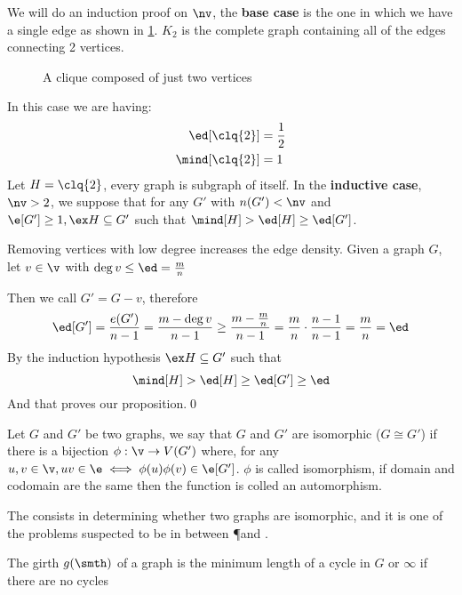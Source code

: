 \begin{prf}
    We will do an induction proof on $\nv$, the \textbf{base case} is the one in which we have a single edge as shown in \ref*{fig:k_2}. $K_2$ is the complete graph containing all of the edges connecting 2 vertices.
    \begin{figure}[h]
        \centering
        
        \caption{A clique composed of just two vertices}
        \label{fig:k_2}
    \end{figure}

    In this case we are having:
    \begin{align*}
        \ed[\clq{2}] &= \frac{1}{2} \\
        \mind[\clq{2}] &= 1
    \end{align*}
    Let $H = \clq{2}$, every graph is subgraph of itself.
    In the \textbf{inductive case}, $\nv > 2$, we suppose that for any $G'$ with $n(G') < \nv$ and $\e[G'] \geq 1, \ex H \subseteq G'$ such that $\mind[H] > \ed[H] \geq \ed[G']$.
    
    Removing vertices with low degree increases the edge density. Given a graph $G$, let $v \in \v$ with $\deg{v} \leq \ed = \frac{m}{n}$

    Then we call $G' = G - v$, therefore
    \begin{equation*}
        \ed[G'] = \frac{e(G')}{n - 1} = \frac{m - \deg{v}}{n - 1} \geq \frac{m - \frac{m}{n}}{n - 1} = \frac{m}{n} \cdot \frac{n - 1}{n - 1} = \frac{m}{n} = \ed
    \end{equation*}
    By the induction hypothesis $\ex H \subseteq G'$ such that
    \begin{equation*}
        \mind[H] > \ed[H] \geq \ed[G'] \geq \ed
    \end{equation*}
    And that proves our proposition.\qed
\end{prf}
Let $G$ and $G'$ be two graphs, we say that $G$ and $G'$ are isomorphic ($G \cong G'$) if there is a bijection $\phi: \v \rightarrow V(G')$ where, for any $u, v \in \v, uv \in \e \iff \phi(u)\phi(v) \in \e[G']$. $\phi$ is called isomorphism, if domain and codomain are the same then the function is colled an automorphism.
\begin{coolfact}
    The  consists in determining whether two graphs are isomorphic, and it is one of the problems suspected to be in between \P and \NP.
\end{coolfact}
\begin{definition}[Girth]
    The girth $g(\smth)$ of a graph is the minimum length of a cycle in $G$ or $\infty$ if there are no cycles
\end{definition}
